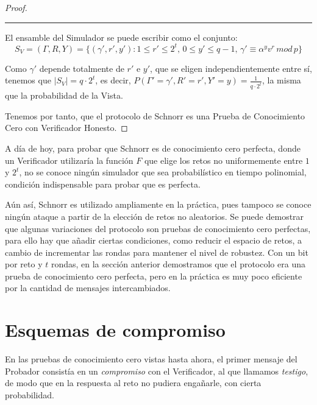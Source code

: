 \begin{proof}
\begin{algorithm}
\begin{enumerate}
	\end{enumerate}
	
\end{algorithm}
\rule{\textwidth}{1pt}


El ensamble del Simulador se puede escribir como el conjunto:
\[
S_{V} = (\Gamma, R, Y) = \{ (\gamma', r', y') : 1\leq r' \leq 2^t,\, 0\leq y'\leq q-1,\, \gamma' \equiv \alpha^y v^r \, mod \, p \}
\]

Como $\gamma'$ depende totalmente de $r'$ e $y'$, que se eligen independientemente entre sí, tenemos que $\mid S_V \mid = q\cdot 2^t$, es decir, $P(\Gamma'=\gamma', R'=r', Y'=y)=\frac{1}{q\cdot 2^t}$, la misma que la probabilidad de la Vista. 


Tenemos por tanto, que el protocolo de Schnorr es una Prueba de Conocimiento Cero con Verificador Honesto.

\end{proof}

\hfil

A día de hoy, para probar que Schnorr es de conocimiento cero perfecta, donde un Verificador utilizaría la función $F$ que elige los retos no uniformemente entre $1$ y $2^t$, no se conoce ningún simulador que sea probabilístico en tiempo polinomial, condición indispensable para probar que es perfecta.


Aún así, Schnorr es utilizado ampliamente en la práctica, pues tampoco se conoce ningún ataque a partir de la elección de retos no aleatorios. Se puede demostrar que algunas variaciones del protocolo son pruebas de conocimiento cero perfectas, para ello hay que añadir ciertas condiciones, como reducir el espacio de retos, a cambio de incrementar las rondas para mantener el nivel de robustez. Con un bit por reto y $t$ rondas, en la sección anterior demostramos que el protocolo era una prueba de conocimiento cero perfecta, pero en la práctica es muy poco eficiente por la cantidad de mensajes intercambiados.





\section{Esquemas de compromiso}\label{bitcommitment}

En las pruebas de conocimiento cero vistas hasta ahora, el primer mensaje del Probador consistía en un \textit{compromiso} con el Verificador, al que llamamos \textit{testigo}, de modo que en la respuesta al reto no pudiera engañarle, con cierta probabilidad.


